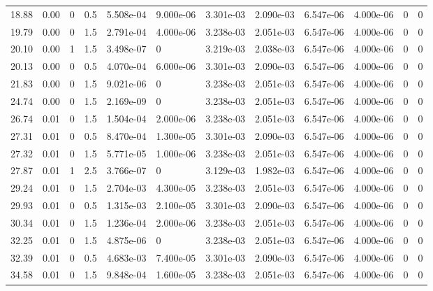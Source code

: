 \documentclass[preview]{standalone}
\begin{document}
{{\begin{tabular}{L{1.2cm}C{1.2cm} C{0.3cm}C{0.5cm} C{1.4cm}C{1.4cm} C{1.4cm}C{1.4cm} C{1.6cm}C{1.6cm} C{1.6cm}C{1.6cm}}
  18.88  &  0.00  & 0     & 0.5 &  5.508e-04  & 9.000e-06  &  3.301e-03&   2.090e-03& 6.547e-06 & 4.000e-06   &  0 & 0  \\ 
  19.79  &  0.00  & 0     & 1.5 &  2.791e-04  & 4.000e-06  &  3.238e-03&   2.051e-03& 6.547e-06 & 4.000e-06   &  0 & 0  \\ 
  20.10  &  0.00  & 1     & 1.5 &  3.498e-07  & 0  &  3.219e-03&   2.038e-03& 6.547e-06 & 4.000e-06   &  0 & 0  \\ 
  20.13  &  0.00  & 0     & 0.5 &  4.070e-04  & 6.000e-06  &  3.301e-03&   2.090e-03& 6.547e-06 & 4.000e-06   &  0 & 0  \\ 
  21.83  &  0.00  & 0     & 1.5 &  9.021e-06  & 0  &  3.238e-03&   2.051e-03& 6.547e-06 & 4.000e-06   &  0 & 0  \\ 
  24.74  &  0.00  & 0     & 1.5 &  2.169e-09  & 0  &  3.238e-03&   2.051e-03& 6.547e-06 & 4.000e-06   &  0 & 0  \\ 
  26.74  &  0.01  & 0     & 1.5 &  1.504e-04  & 2.000e-06  &  3.238e-03&   2.051e-03& 6.547e-06 & 4.000e-06   &  0 & 0  \\ 
  27.31  &  0.01  & 0     & 0.5 &  8.470e-04  & 1.300e-05  &  3.301e-03&   2.090e-03& 6.547e-06 & 4.000e-06   &  0 & 0  \\ 
  27.32  &  0.01  & 0     & 1.5 &  5.771e-05  & 1.000e-06  &  3.238e-03&   2.051e-03& 6.547e-06 & 4.000e-06   &  0 & 0  \\ 
  27.87  &  0.01  & 1     & 2.5 &  3.766e-07  & 0  &  3.129e-03&   1.982e-03& 6.547e-06 & 4.000e-06   &  0 & 0  \\ 
  29.24  &  0.01  & 0     & 1.5 &  2.704e-03  & 4.300e-05  &  3.238e-03&   2.051e-03& 6.547e-06 & 4.000e-06   &  0 & 0  \\ 
  29.93  &  0.01  & 0     & 0.5 &  1.315e-03  & 2.100e-05  &  3.301e-03&   2.090e-03& 6.547e-06 & 4.000e-06   &  0 & 0  \\ 
  30.34  &  0.01  & 0     & 1.5 &  1.236e-04  & 2.000e-06  &  3.238e-03&   2.051e-03& 6.547e-06 & 4.000e-06   &  0 & 0  \\ 
  32.25  &  0.01  & 0     & 1.5 &  4.875e-06  & 0  &  3.238e-03&   2.051e-03& 6.547e-06 & 4.000e-06   &  0 & 0  \\ 
  32.39  &  0.01  & 0     & 0.5 &  4.683e-03  & 7.400e-05  &  3.301e-03&   2.090e-03& 6.547e-06 & 4.000e-06   &  0 & 0  \\ 
  34.58  &  0.01  & 0     & 1.5 &  9.848e-04  & 1.600e-05  &  3.238e-03&   2.051e-03& 6.547e-06 & 4.000e-06   &  0 & 0  \\ 
\hline 
\end{tabular} 

}}
\end{document}
